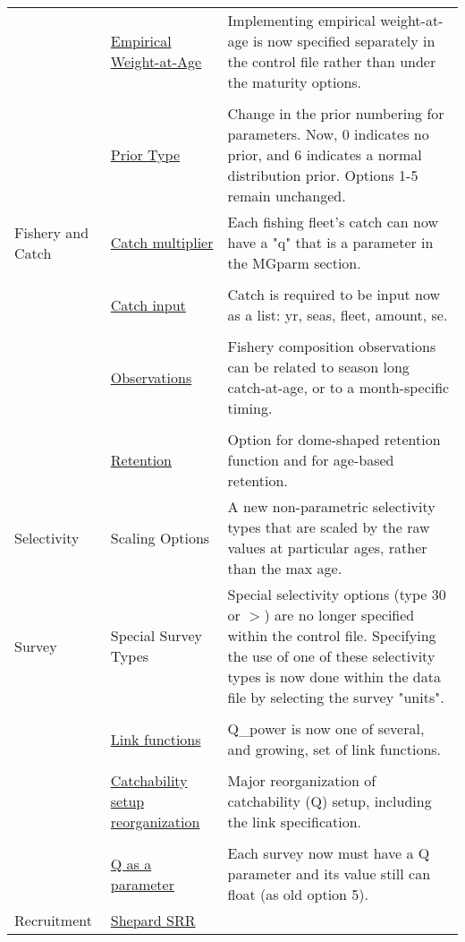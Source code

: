 \documentclass[12pt]{article}
\begin{document}
\begin{center}
\begin{longtable}{p{2cm} p{3cm} p{10cm}}
	& \hyperlink{WAAparm} {Empirical Weight-at-Age} & Implementing empirical weight-at-age is now specified separately in the control file rather than under the maturity options.\\
	\\
	& \hyperlink{Priors}{Prior Type} & Change in the prior numbering for parameters.  Now, 0 indicates no prior, and 6 indicates a normal distribution prior. Options 1-5 remain unchanged.\\
	\hline
	Fishery and Catch & 
	\hyperlink{CatchMult}{Catch multiplier} & 
	Each fishing fleet's catch can now have a "q" that is a parameter in the MGparm section.\\
	\\						
	& \hyperlink{CatchFormat}{Catch input} & 
	Catch is required to be input now as a list:  yr, seas, fleet, amount, se. \\
	\\						
	& \hyperlink{CompTiming}{Observations} & 
	Fishery composition observations can be related to season long catch-at-age, or to a month-specific timing.\\
	\\					
	& \hyperlink{DomeRetention}{Retention} & 
	Option for dome-shaped retention function and for age-based retention. \\
	\hline
	Selectivity 
	& Scaling Options& 	
	A new non-parametric selectivity types that are scaled by the raw values at particular ages, rather than the max age.\\
	\hline
	Survey
	& Special Survey Types & 
	Special selectivity options (type 30 or $>$) are no longer specified within the control file.  Specifying the use of one of these selectivity types is now done within the data file by selecting the survey "units". \\  
	\\
	& \hyperlink{Qsetup}{Link functions} & 
	Q\_power is now one of several, and growing, set of link functions. \\
	\\						
	& \hyperlink{Qsetup}{Catchability setup reorganization} & 
	Major reorganization of catchability (Q) setup, including the link specification. \\
	\\					
	& \multicolumn{1}{l}{\hyperlink{Qsetup}{Q as a parameter}} & 
	Each survey now must have a Q parameter and its value still can float (as old option 5).\\
	\hline
	Recruitment
	& \hyperlink{Shepard}{Shepard SRR} & 

\end{longtable}
\end{center}
\end{document}
